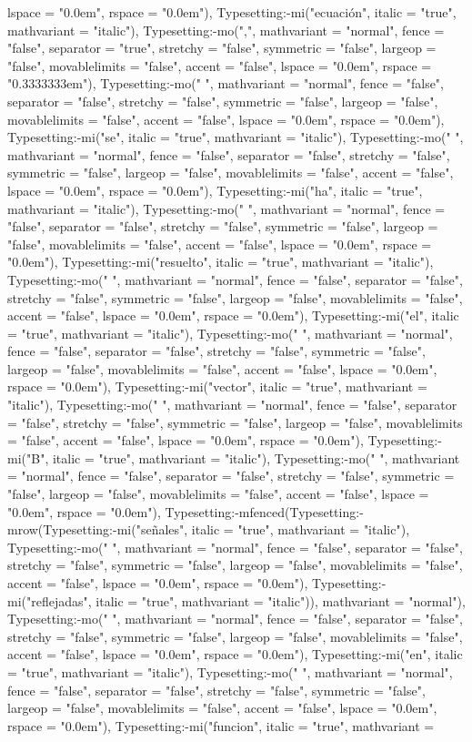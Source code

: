 \documentclass{article}
\begin{document}
\begin{Maple Normal}
{\begin{Maple Normal}
{lspace = "0.0em", rspace = "0.0em"), Typesetting:-mi("ecuación", italic = "true", mathvariant = "italic"), Typesetting:-mo(",", mathvariant = "normal", fence = "false", separator = "true", stretchy = "false", symmetric = "false", largeop = "false", movablelimits = "false", accent = "false", lspace = "0.0em", rspace = "0.3333333em"), Typesetting:-mo(" ", mathvariant = "normal", fence = "false", separator = "false", stretchy = "false", symmetric = "false", largeop = "false", movablelimits = "false", accent = "false", lspace = "0.0em", rspace = "0.0em"), Typesetting:-mi("se", italic = "true", mathvariant = "italic"), Typesetting:-mo(" ", mathvariant = "normal", fence = "false", separator = "false", stretchy = "false", symmetric = "false", largeop = "false", movablelimits = "false", accent = "false", lspace = "0.0em", rspace = "0.0em"), Typesetting:-mi("ha", italic = "true", mathvariant = "italic"), Typesetting:-mo(" ", mathvariant = "normal", fence = "false", separator = "false", stretchy = "false", symmetric = "false", largeop = "false", movablelimits = "false", accent = "false", lspace = "0.0em", rspace = "0.0em"), Typesetting:-mi("resuelto", italic = "true", mathvariant = "italic"), Typesetting:-mo(" ", mathvariant = "normal", fence = "false", separator = "false", stretchy = "false", symmetric = "false", largeop = "false", movablelimits = "false", accent = "false", lspace = "0.0em", rspace = "0.0em"), Typesetting:-mi("el", italic = "true", mathvariant = "italic"), Typesetting:-mo(" ", mathvariant = "normal", fence = "false", separator = "false", stretchy = "false", symmetric = "false", largeop = "false", movablelimits = "false", accent = "false", lspace = "0.0em", rspace = "0.0em"), Typesetting:-mi("vector", italic = "true", mathvariant = "italic"), Typesetting:-mo(" ", mathvariant = "normal", fence = "false", separator = "false", stretchy = "false", symmetric = "false", largeop = "false", movablelimits = "false", accent = "false", lspace = "0.0em", rspace = "0.0em"), Typesetting:-mi("B", italic = "true", mathvariant = "italic"), Typesetting:-mo(" ", mathvariant = "normal", fence = "false", separator = "false", stretchy = "false", symmetric = "false", largeop = "false", movablelimits = "false", accent = "false", lspace = "0.0em", rspace = "0.0em"), Typesetting:-mfenced(Typesetting:-mrow(Typesetting:-mi("señales", italic = "true", mathvariant = "italic"), Typesetting:-mo(" ", mathvariant = "normal", fence = "false", separator = "false", stretchy = "false", symmetric = "false", largeop = "false", movablelimits = "false", accent = "false", lspace = "0.0em", rspace = "0.0em"), Typesetting:-mi("reflejadas", italic = "true", mathvariant = "italic")), mathvariant = "normal"), Typesetting:-mo(" ", mathvariant = "normal", fence = "false", separator = "false", stretchy = "false", symmetric = "false", largeop = "false", movablelimits = "false", accent = "false", lspace = "0.0em", rspace = "0.0em"), Typesetting:-mi("en", italic = "true", mathvariant = "italic"), Typesetting:-mo(" ", mathvariant = "normal", fence = "false", separator = "false", stretchy = "false", symmetric = "false", largeop = "false", movablelimits = "false", accent = "false", lspace = "0.0em", rspace = "0.0em"), Typesetting:-mi("funcion", italic = "true", mathvariant = }
\end{Maple Normal}}
\end{Maple Normal}
\end{document}
